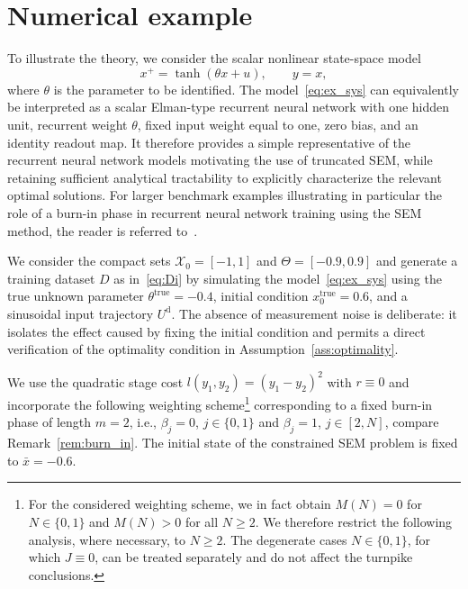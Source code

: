 \documentclass[a4paper,fleqn]{cas-dc}
\begin{document}
\section{Numerical example}\label{sec:example}

To illustrate the theory, we consider the scalar nonlinear state-space model
\begin{equation}
	x^+ = \tanh(\theta x + u), \qquad y=x, \label{eq:ex_sys}
\end{equation}
where $\theta$ is the parameter to be identified.
The model~\eqref{eq:ex_sys} can equivalently be interpreted as a scalar Elman-type recurrent neural network with one hidden unit, recurrent weight $\theta$, fixed input weight equal to one, zero bias, and an identity readout map. It therefore provides a simple representative of the recurrent neural network models motivating the use of truncated SEM, while retaining sufficient analytical tractability to explicitly characterize the relevant optimal solutions. For larger benchmark examples illustrating in particular the role of a burn-in phase in recurrent neural network training using the SEM method, the reader is referred to~\cite{Schiller2025b}.

We consider the compact sets $\mathcal{X}_0 = [-1,1]$ and $\Theta = [-0.9,0.9]$ and generate a training dataset $D$ as in~\eqref{eq:Di} by simulating the model~\eqref{eq:ex_sys} using the true unknown parameter $\theta^\mathrm{true} = -0.4$, initial condition $x_0^\mathrm{true}=0.6$, and a sinusoidal input trajectory $U^\mathrm{d}$.
The absence of measurement noise is deliberate: it isolates the effect caused by fixing the initial condition and permits a direct verification of the optimality condition in Assumption~\ref{ass:optimality}.

We use the quadratic stage cost $l(y_1,y_2) = (y_1 - y_2)^2$ with $r \equiv 0$ and incorporate the following weighting scheme\footnote{
	For the considered weighting scheme, we in fact obtain $M(N)=0$ for $N\in\{0,1\}$ and $M(N)>0$ for all $N\geq2$. We therefore restrict the following analysis, where necessary, to $N\geq2$. The degenerate cases $N\in\{0,1\}$, for which $J\equiv0$, can be treated separately and do not affect the turnpike conclusions.
} corresponding to a fixed burn-in phase of length $m=2$, i.e., $\beta_j = 0$, $j\in\{0,1\}$ and $\beta_j = 1$, $j\in[2,N]$, compare Remark~\ref{rem:burn_in}.
The initial state of the constrained SEM problem is fixed to $\bar{x}=-0.6$.
\end{document}
